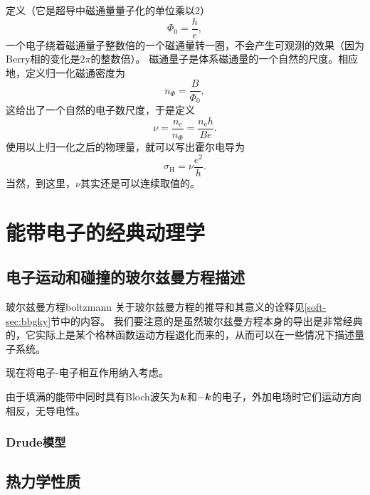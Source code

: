 定义（它是超导中磁通量量子化的单位乘以2）
\begin{equation}
    \Phi_0 = \frac{h}{e},
\end{equation}
一个电子绕着磁通量子整数倍的一个磁通量转一圈，不会产生可观测的效果（因为Berry相的变化是$2\pi$的整数倍）。
磁通量子是体系磁通量的一个自然的尺度。相应地，定义归一化磁通密度为
\begin{equation}
    n_{\Phi} = \frac{B}{\Phi_0},
\end{equation}
这给出了一个自然的电子数尺度，于是定义
\begin{equation}
    \nu = \frac{n_\text{e}}{n_\Phi} = \frac{n_\text{e} h}{B e}.
\end{equation}
使用以上归一化之后的物理量，就可以写出霍尔电导为
\begin{equation}
    \sigma_\text{H} = \nu \frac{e^2}{h}.
    \label{eq:classical-hall-conductivity}
\end{equation}
当然，到这里，$\nu$其实还是可以连续取值的。

\section{能带电子的经典动理学}

\subsection{电子运动和碰撞的玻尔兹曼方程描述}

\begin{back}{玻尔兹曼方程}{boltzmann}
    关于玻尔兹曼方程的推导和其意义的诠释见\ref{soft-sec:bbgky}节中的内容。
    我们要注意的是虽然玻尔兹曼方程本身的导出是非常经典的，它实际上是某个格林函数运动方程退化而来的，从而可以在一些情况下描述量子系统。
\end{back}

现在将电子-电子相互作用纳入考虑。

由于填满的能带中同时具有Bloch波矢为$\vb*{k}$和$-\vb*{k}$的电子，外加电场时它们运动方向相反，无导电性。

\subsubsection{Drude模型}

\subsection{热力学性质}

